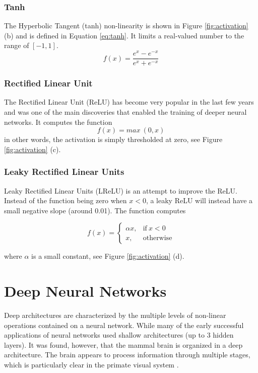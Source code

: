 \subsubsection{Tanh}

The Hyperbolic Tangent (tanh) non-linearity is shown in Figure \ref{fig:activation} (b) and is defined in Equation \ref{eq:tanh}. It limits a real-valued number to the range of $[-1, 1]$. 
\begin{equation}
f(x) = \frac{e^x - e^{-x}}{e^x + e^{-x}}
\label{eq:tanh}
\end{equation}

\subsubsection{Rectified Linear Unit}

The Rectified Linear Unit (ReLU) has become very popular in the last few years and was one of the main discoveries that enabled the training of deeper neural networks. It computes the function 
\begin{equation}
f(x)=max \: (0,x)
\label{eq:relu}
\end{equation}
in other words, the activation is simply thresholded at zero, see Figure \ref{fig:activation} (c). 

\subsubsection{Leaky Rectified Linear Units}

Leaky Rectified Linear Units (LReLU) is an attempt to improve the ReLU. Instead of the function being zero when $x < 0$, a leaky ReLU will instead have a small negative slope (around 0.01). The function computes

\begin{equation}
f(x)=\begin{cases}
      \alpha x, & \text{if}\ x < 0\\
      x, & \text{otherwise}
    \end{cases}
\label{eq:lrelu}
\end{equation}

where $\alpha$ is a small constant, see Figure \ref{fig:activation} (d). 


\section{Deep Neural Networks}
Deep architectures are characterized by the multiple levels of non-linear operations
contained on a neural network. While many of the early successful applications of neural networks used shallow architectures (up to 3 hidden layers). It was found, however, that the mammal brain is organized in a deep architecture. The brain appears to process information through multiple stages, which is particularly clear in the primate visual system \cite{bengio2009learning}. 


